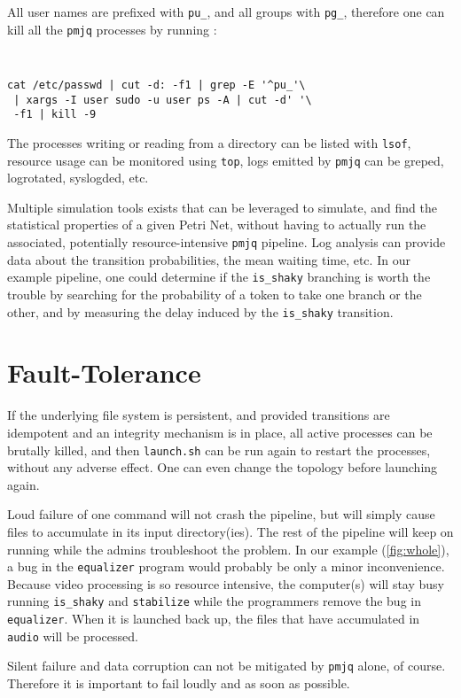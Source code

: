 \documentclass[letterpaper,twocolumn,10pt]{article}
\begin{document}
All user names are prefixed with {\tt pu\_}, and all groups with {\tt pg\_}, therefore one can kill all the {\tt pmjq} processes by running :
{\tt \small
\begin{verbatim}
cat /etc/passwd | cut -d: -f1 | grep -E '^pu_'\
 | xargs -I user sudo -u user ps -A | cut -d' '\
 -f1 | kill -9
\end{verbatim}
}

The processes writing or reading from a directory can be listed with {\tt lsof}, resource usage can be monitored using {\tt top}, logs emitted by {\tt pmjq} can be greped, logrotated, syslogded, etc.

Multiple simulation tools exists that can be leveraged to simulate, and find the statistical properties of a given Petri Net, without having to actually run the associated, potentially resource-intensive {\tt pmjq} pipeline. Log analysis can provide data about the transition probabilities, the mean waiting time, etc. In our example pipeline, one could determine if the {\tt is\_shaky} branching is worth the trouble by searching for the probability of a token to take one branch or the other, and by measuring the delay induced by the {\tt is\_shaky} transition.

\section{Fault-Tolerance}
\label{sec:ft}

If the underlying file system is persistent, and provided transitions are idempotent and an integrity mechanism is in place, all active processes can be brutally killed, and then {\tt launch.sh} can be run again to restart the processes, without any adverse effect. One can even change the topology before launching again.

Loud failure of one command will not crash the pipeline, but will simply cause files to accumulate in its input directory(ies). The rest of the pipeline will keep on running while the admins troubleshoot the problem. In our example (\autoref{fig:whole}), a bug in the {\tt equalizer} program would probably be only a minor inconvenience. Because video processing is so resource intensive, the computer(s) will stay busy running {\tt is\_shaky} and {\tt stabilize} while the programmers remove the bug in {\tt equalizer}. When it is launched back up, the files that have accumulated in {\tt audio} will be processed.

Silent failure and data corruption can not be mitigated by {\tt pmjq} alone, of course. Therefore it is important to fail loudly and as soon as possible.
\end{document}
